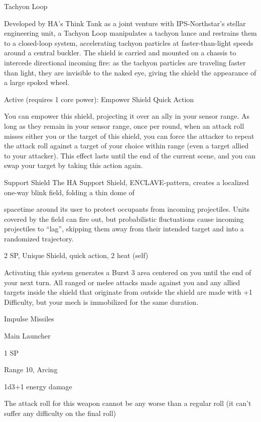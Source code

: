                                                   Tachyon Loop

 Developed by HA’s Think Tank as a joint venture with IPS-Northstar’s stellar engineering unit, a Tachyon
 Loop manipulates a tachyon lance and restrains them to a closed-loop system, accelerating tachyon
 particles at faster-than-light speeds around a central buckler. The shield is carried and mounted on a
 chassis to intercede directional incoming fire: as the tachyon particles are traveling faster than light, they
 are invisible to the naked eye, giving the shield the appearance of a large spoked wheel.

 Active (requires 1 core power): Empower Shield
 Quick Action

 You can empower this shield, projecting it over an ally in your sensor range. As long as they remain in
 your sensor range, once per round, when an attack roll misses either you or the target of this shield,
 you can force the attacker to repeat the attack roll against a target of your choice within range (even a
 target allied to your attacker). This effect lasts until the end of the current scene, and you can swap
 your target by taking this action again.

Support Shield
The HA Support Shield, ENCLAVE-pattern, creates a localized one-way blink field, folding a thin dome of

spacetime around its user to protect occupants from incoming projectiles. Units covered by the field can
fire out, but probabilistic fluctuations cause incoming projectiles to “lag”, skipping them away from their
intended target and into a randomized trajectory.

2 SP, Unique
Shield, quick action, 2 heat (self)


Activating this system generates a Burst 3 area centered on you until the end of your next turn.
All ranged or melee attacks made against you and any allied targets inside the shield that
originate from outside the shield are made with +1 Difficulty, but your mech is immobilized for the
same duration.


Impulse Missiles

Main Launcher

1 SP

Range 10, Arcing

1d3+1 energy damage

The attack roll for this weapon cannot be any worse than a regular roll (it can’t suffer any
difficulty on the final roll)



